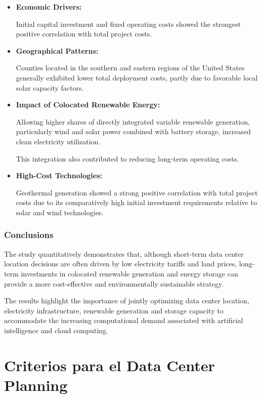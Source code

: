 \begin{itemize}

    \item \textbf{Economic Drivers:}

    Initial capital investment and fixed operating costs showed the strongest positive correlation with total project costs.

    \item \textbf{Geographical Patterns:}

    Counties located in the southern and eastern regions of the United States generally exhibited lower total deployment costs, partly due to favorable local solar capacity factors.

    \item \textbf{Impact of Colocated Renewable Energy:}

    Allowing higher shares of directly integrated variable renewable generation, particularly wind and solar power combined with battery storage, increased clean electricity utilization.

    This integration also contributed to reducing long-term operating costs.

    \item \textbf{High-Cost Technologies:}

    Geothermal generation showed a strong positive correlation with total project costs due to its comparatively high initial investment requirements relative to solar and wind technologies.

\end{itemize}

\subsubsection{Conclusions}

The study quantitatively demonstrates that, although short-term data center location decisions are often driven by low electricity tariffs and land prices, long-term investments in colocated renewable generation and energy storage can provide a more cost-effective and environmentally sustainable strategy.

The results highlight the importance of jointly optimizing data center location, electricity infrastructure, renewable generation and storage capacity to accommodate the increasing computational demand associated with artificial intelligence and cloud computing.



\section{Criterios para el Data Center Planning}

